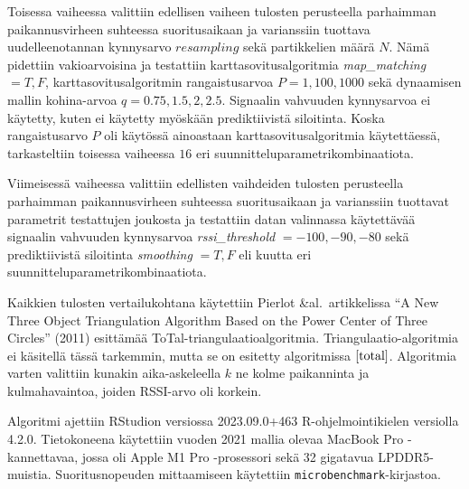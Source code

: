 \documentclass[
  12pt,
  a4paper, twoside]{book}
\begin{document}
Toisessa vaiheessa valittiin edellisen vaiheen tulosten perusteella parhaimman paikannusvirheen suhteessa suoritusaikaan ja varianssiin tuottava uudelleenotannan kynnysarvo \(resampling\) sekä partikkelien määrä \(N\). Nämä pidettiin vakioarvoisina ja testattiin karttasovitusalgoritmia \emph{map\_matching} \(={T,F}\), karttasovitusalgoritmin rangaistusarvoa \(P={1,100,1000}\) sekä dynaamisen mallin kohina-arvoa \(q={0.75,1.5,2,2.5}\). Signaalin vahvuuden kynnysarvoa ei käytetty, kuten ei käytetty myöskään prediktiivistä siloitinta. Koska rangaistusarvo \(P\) oli käytössä ainoastaan karttasovitusalgoritmia käytettäessä, tarkasteltiin toisessa vaiheessa \(16\) eri suunnitteluparametrikombinaatiota.

Viimeisessä vaiheessa valittiin edellisten vaihdeiden tulosten perusteella parhaimman paikannusvirheen suhteessa suoritusaikaan ja varianssiin tuottavat parametrit testattujen joukosta ja testattiin datan valinnassa käytettävää signaalin vahvuuden kynnysarvoa \emph{rssi\_threshold} \(={-100,-90,-80}\) sekä prediktiivistä siloitinta \emph{smoothing} \(={T,F}\) eli kuutta eri suunnitteluparametrikombinaatiota.

Kaikkien tulosten vertailukohtana käytettiin Pierlot \&al.~artikkelissa ``A New Three Object Triangulation Algorithm Based on the Power Center of Three Circles'' (2011) esittämää ToTal-triangulaatioalgoritmia. \citep{Pierlot-2011} Triangulaatio-algoritmia ei käsitellä tässä tarkemmin, mutta se on esitetty algoritmissa \(\ref{total}\). Algoritmia varten valittiin kunakin aika-askeleella \(k\) ne kolme paikanninta ja kulmahavaintoa, joiden RSSI-arvo oli korkein.

Algoritmi ajettiin RStudion versiossa 2023.09.0+463 R-ohjelmointikielen versiolla 4.2.0. Tietokoneena käytettiin vuoden 2021 mallia olevaa MacBook Pro -kannettavaa, jossa oli Apple M1 Pro -prosessori sekä 32 gigatavua LPDDR5-muistia. Suoritusnopeuden mittaamiseen käytettiin \texttt{microbenchmark}-kirjastoa.
\end{document}
